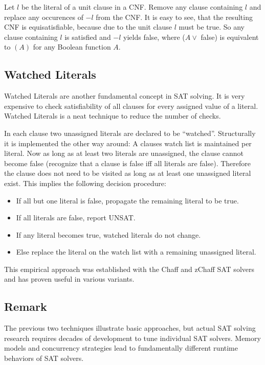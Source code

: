 Let $l$ be the literal of a unit clause in a CNF. Remove any clause containing
$l$ and replace any occurences of $-l$ from the CNF. It is easy to see, that
the resulting CNF is equisatisfiable, because due to the unit clause $l$ must
be true. So any clause containing $l$ is satisfied and $-l$ yields false,
where ($A \lor $ false) is equivalent to $(A)$ for any Boolean function $A$.

\subsection{Watched Literals}
\label{sec:sat-wl}
%
Watched Literals are another fundamental concept in SAT solving. It is very
expensive to check satisfiability of all clauses for every assigned value
of a literal. Watched Literals is a neat technique to reduce the number of checks.

In each clause two unassigned literals are declared to be \enquote{watched}.
Structurally it is implemented the other way around:
A clauses watch list is maintained per literal.
Now as long as at least two literals are unassigned, the clause cannot become
false (recognize that a clause is false iff all literals are false).
Therefore the clause does not need to be visited as long as at least one
unassigned literal exist. This implies the following decision procedure:
\begin{itemize}
  \item If all but one literal is false, propagate the remaining literal to be true.
  \item If all literals are false, report UNSAT.
  \item If any literal becomes true, watched literals do not change.
  \item Else replace the literal on the watch list with a remaining unassigned literal.
\end{itemize}

This empirical approach was established with the Chaff and zChaff SAT
solvers~\cite{moskewicz2001chaff} and has proven useful in various variants.

\subsection{Remark}
\label{sec:sat-remark}
%
The previous two techniques illustrate basic approaches, but actual SAT
solving research requires decades of development to tune individual SAT solvers.
Memory models and concurrency strategies lead to fundamentally different runtime
behaviors of SAT solvers.

